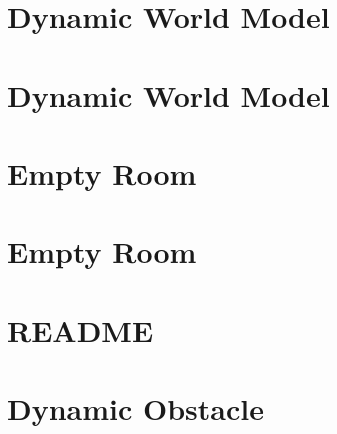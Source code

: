 \documentclass[twoside]{book}
\newcommand{\+}{\discretionary{\mbox{\scriptsize$\hookleftarrow$}}{}{}}
\begin{document}
\chapter{Dynamic World Model}
\label{md_smacc2_sm_reference_library_sm_dance_bot_warehouse_2_models_dynamic_world_copy_README}

\chapter{Dynamic World Model}
\label{md_smacc2_sm_reference_library_sm_dance_bot_warehouse_2_models_dynamic_world_README}

\chapter{Empty Room}
\label{md_smacc2_sm_reference_library_sm_dance_bot_warehouse_2_models_empty_room_copy_README}

\chapter{Empty Room}
\label{md_smacc2_sm_reference_library_sm_dance_bot_warehouse_2_models_empty_room_README}

\chapter{README}
\label{md_smacc2_sm_reference_library_sm_dance_bot_warehouse_2_README}

\chapter{Dynamic Obstacle}
\label{md_smacc2_sm_reference_library_sm_dance_bot_warehouse_3_models_dynamic_obstacle_copy_README}

\end{document}
